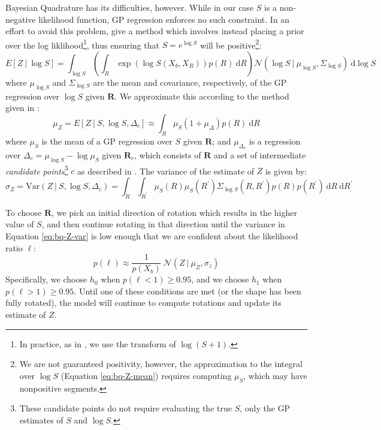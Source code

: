 \documentclass{article} %
\begin{document}
Bayesian Quadrature has its difficulties, however. While in our case
$S$ is a non-negative likelihood function, GP regression enforces no
such constraint. In an effort to avoid this problem,
\cite{Osborne:2012tm} give a method which involves instead placing a
prior over the log liklihood\footnote{In practice, as in
  \cite{Osborne:2012tm}, we use the transform of $\log(S+1)$.}, thus
ensuring that $S=e^{\log S}$ will be positive\footnote{We are not
  guaranteed positivity, however, the approximation to the integral
  over $\log S$ (Equation \ref{eq:bq-Z-mean}) requires computing
  $\mu_S$, which may have nonpositive segments.}:
\begin{equation*}
  E[Z\ \vert \ \log S]=\int_{\log S}\left(\int_R \exp(\log{S(X_b,X_R)})p(R)\ \mathrm{d}R\right)\mathcal{N}\left(\log{S}\ \vert \ \mu_{\log S}, \Sigma_{\log S}\right)\ \mathrm{d}\log S
\end{equation*}
where $\mu_{\log S}$ and $\Sigma_{\log S}$ are the mean and
covariance, respectively, of the GP regression over $\log S$ given
$\mathbf{R}$. We approximate this according to the method given in
\cite{Osborne:2012tm}:
\begin{equation}
  \mu_Z=E[Z\ \vert \ S, \log S, \Delta_c] \approx \int_R \mu_{S}(1 + \mu_\Delta) p(R)\ \mathrm{d}R 
  \label{eq:bq-Z-mean}
\end{equation}
where $\mu_S$ is the mean of a GP regression over $S$ given
$\mathbf{R}$; and $\mu_{\Delta_c}$ is a regression over
$\Delta_c=\mu_{\log S} - \log \mu_S$ given $\mathbf{R}_c$, which
consists of $\mathbf{R}$ and a set of intermediate \emph{candidate
  points}\footnote{These candidate points do not require evaluating
  the true $S$, only the GP estimates of $S$ and $\log S$.} $c$ as
described in \cite{Osborne:2012tm}. The variance of the estimate of
$Z$ is given by:
\begin{equation}
  \sigma_Z=\mathrm{Var}(Z\ \vert \ S, \log S, \Delta_c) = \int_R\int_{R^\prime} \mu_S(R)\mu_S(R^\prime) \Sigma_{\log S}(R, R^\prime)p(R)p(R^\prime)\ \mathrm{d}R\ \mathrm{d}R^\prime
  \label{eq:bq-Z-var}
\end{equation}

To choose $\mathbf{R}$, we pick an initial direction of rotation which
results in the higher value of $S$, and then continue rotating in that
direction until the variance in Equation \ref{eq:bq-Z-var} is low
enough that we are confident about the likelihood ratio $\ell$:
\begin{equation*}
p(\ell)\approx\frac{1}{p(X_b)}\ \mathcal{N}(Z\ \vert\ \mu_Z, \sigma_z)
\end{equation*}
Specifically, we choose $h_0$ when $p(\ell < 1)\geq 0.95$, and we
choose $h_1$ when $p(\ell > 1)\geq 0.95$. Until one of these
conditions are met (or the shape has been fully rotated), the model
will continue to compute rotations and update its estimate of $Z$.
\end{document}
